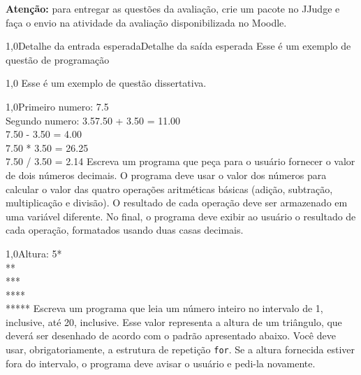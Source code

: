 \documentclass[
    12pt,     
    openright,
    twoside,  
    a4paper,  
    english,  
    brazil,   
]{memoir}
\begin{document}
\mainmatter



\textbf{Atenção:} para entregar as questões da avaliação, crie um pacote no JJudge e faça o envio na atividade da avaliação disponibilizada no Moodle.



\begin{questaoProgramacao}{1,0}{Detalhe da entrada esperada}{Detalhe da saída esperada}
    Esse é um exemplo de questão de programação
\end{questaoProgramacao}



\begin{questaoDissertativa}{1,0}
    Esse é um exemplo de questão dissertativa.
\end{questaoDissertativa}



\begin{questaoProgramacao}{1,0}{Primeiro numero: 7.5\\Segundo numero: 3.5}{7.50 + 3.50 = 11.00\\7.50 - 3.50 = 4.00\\7.50 * 3.50 = 26.25\\7.50 / 3.50 = 2.14}
    Escreva um programa que peça para o usuário fornecer o valor de dois números decimais. O programa deve usar o valor dos números para calcular o valor das quatro operações aritméticas básicas (adição, subtração, multiplicação e divisão). O resultado de cada operação deve ser armazenado em uma variável diferente. No final, o programa deve exibir ao usuário o resultado de cada operação, formatados usando duas casas decimais.
\end{questaoProgramacao}



\begin{questaoProgramacao}{1,0}{Altura: 5}{*\\
**\\
***\\
****\\
*****}
    Escreva um programa que leia um número inteiro no intervalo de 1, inclusive, até 20, inclusive. Esse valor representa a altura de um triângulo, que deverá ser desenhado de acordo com o padrão apresentado abaixo. Você deve usar, obrigatoriamente, a estrutura de repetição \texttt{for}. Se a altura fornecida estiver fora do intervalo, o programa deve avisar o usuário e pedi-la novamente.
\end{questaoProgramacao}
\end{document}

